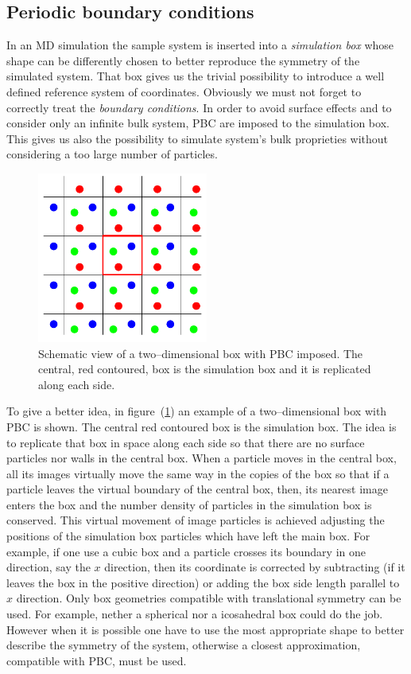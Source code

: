 \subsection{Periodic boundary conditions}
In an \ac{MD} simulation the sample system is inserted into a \textit{simulation box} whose shape can be
differently chosen to better reproduce the symmetry of the simulated system. That box gives us the trivial
possibility to introduce a well defined reference system of coordinates. Obviously we must not forget to
correctly treat the \textit{boundary conditions}. In order to avoid surface effects and to consider only an
infinite bulk system, \ac{PBC} are imposed to the simulation box. This gives us also the possibility to simulate
system's bulk proprieties without considering a too large number of particles.
\begin{figure}
	\includegraphics[width=0.5\textwidth]{./img/PBCScheme/PBCScheme}
	\caption{Schematic view of a two--dimensional box with \acs{PBC} imposed. The central, red contoured, box is the simulation box and it is replicated along each side.}
	\label{fig:pbc}
\end{figure}
To give a better idea, in figure~(\ref{fig:pbc}) an example of a two--dimensional box with \ac{PBC} is shown. The
central red contoured box is the simulation box. The idea is to replicate that box in space along each side so
that there are no surface particles nor walls in the central box. When a particle moves in the central box, all
its images virtually move the same way in the copies of the box so that if a particle leaves the virtual boundary
of the central box, then, its nearest image enters the box and the number density of particles in the simulation
box is conserved. This virtual movement of image particles is achieved adjusting the positions of the simulation
box particles which have left the main box. For example, if one use a cubic box and a particle crosses its
boundary in one direction, say the $x$ direction, then its coordinate is corrected by subtracting (if it leaves
the box in the positive direction) or adding the box side length parallel to $x$ direction. Only box geometries
compatible with translational symmetry can be used. For example, nether a spherical nor a icosahedral box could
do the job. However when it is possible one have to use the most appropriate shape to better describe the
symmetry of the system, otherwise a closest approximation, compatible with \ac{PBC}, must be used.

